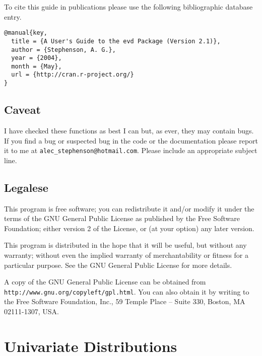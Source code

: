\documentclass[11pt,a4paper]{article}
\begin{document}
To cite this guide in publications please use the following
bibliographic database entry. 
\begin{verbatim}
@manual{key,
  title = {A User's Guide to the evd Package (Version 2.1)},
  author = {Stephenson, A. G.},
  year = {2004},
  month = {May},
  url = {http://cran.r-project.org/}
}
\end{verbatim}

\subsection{Caveat}

I have checked these functions as best I can but, as ever, they may
contain bugs. 
If you find a bug or suspected bug in the code or the documentation
please report it to me at \verb+alec_stephenson@hotmail.com+.  
Please include an appropriate subject line.

\subsection{Legalese}

This program is free software; you can redistribute it and/or
modify it under the terms of the GNU General Public License
as published by the Free Software Foundation; either version 2
of the License, or (at your option) any later version.

This program is distributed in the hope that it will be useful,
but without any warranty; without even the implied warranty of
merchantability or fitness for a particular purpose.  
See the GNU General Public License for more details.

A copy of the GNU General Public License can be obtained from 
\verb+http://www.gnu.org/copyleft/gpl.html+.
You can also obtain it by writing to the Free Software Foundation, 
Inc., 59 Temple Place -- Suite 330, Boston, MA 02111-1307, USA. 

\section{Univariate Distributions}
\setcounter{footnote}{0}
\label{uni}
\end{document}
